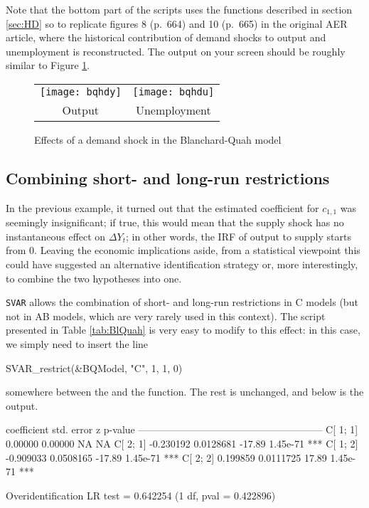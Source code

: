 \documentclass[a4paper,10pt]{article}
\newcommand{\dtk}[1]{\texttt{\detokenize{#1}}}
\newcounter{script}[section]
\begin{document}
Note that the bottom part of the scripts uses the functions described
in section \ref{sec:HD} so to replicate figures 8 (p.~664) and 10
(p.~665) in the original AER article, where the historical
contribution of demand shocks to output and unemployment is
reconstructed. The output on your screen should be roughly similar to
Figure \ref{fig:BlQuah-HD-Output}.

\begin{figure}[hbtp]
  \centering
  \begin{tabular}{cc}
    \texttt{[image: bqhdy]} &
    \texttt{[image: bqhdu]} \\
    Output & Unemployment
  \end{tabular}
  \caption{Effects of a demand shock in the Blanchard-Quah model}
  \label{fig:BlQuah-HD-Output}
\end{figure}

\subsection{Combining short- and long-run restrictions}
\label{sec:C-combined}

In the previous example, it turned out that the estimated coefficient
for $c_{1,1}$ was seemingly insignificant; if true, this would mean
that the supply shock has no instantaneous effect on $\Delta Y_t$; in
other words, the IRF of output to supply starts from 0. Leaving the
economic implications aside, from a statistical viewpoint this could
have suggested an alternative identification strategy or, more
interestingly, to combine the two hypotheses into one. 

\texttt{SVAR} allows the combination of short- and long-run 
restrictions in C models (but not in AB models, which are very rarely used 
in this context). The script presented in Table \ref{tab:BlQuah} is very easy to modify
to this effect: in this case, we simply need to insert the line 
\begin{code}
  SVAR_restrict(&BQModel, "C", 1, 1, 0)
\end{code}
somewhere between the \dtk{SVAR_setup} and the
\dtk{SVAR_estimate} function. 
The rest is unchanged, and below is the output.


\begin{code}
             coefficient   std. error     z       p-value 
  --------------------------------------------------------
  C[ 1; 1]     0.00000     0.00000       NA      NA       
  C[ 2; 1]    -0.230192    0.0128681    -17.89    1.45e-71 ***
  C[ 1; 2]    -0.909033    0.0508165    -17.89    1.45e-71 ***
  C[ 2; 2]     0.199859    0.0111725     17.89    1.45e-71 ***

Overidentification LR test = 0.642254 (1 df, pval = 0.422896)
\end{code}
\end{document}
